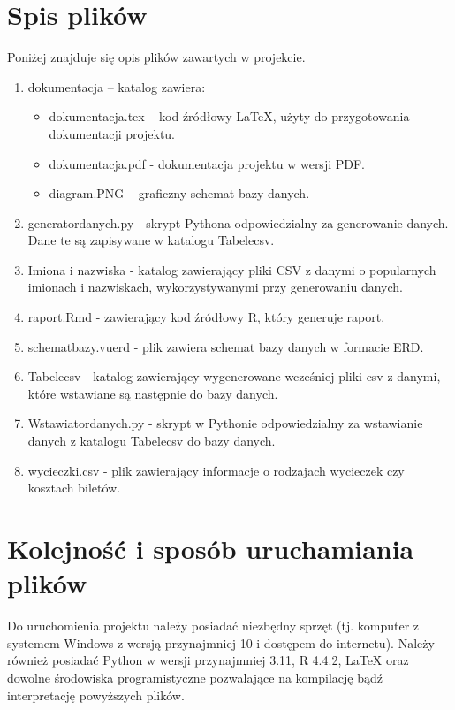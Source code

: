 \documentclass{article}
\begin{document}
	\section{Spis plików}
	
	Poniżej znajduje się opis plików zawartych w projekcie.
	\begin{enumerate}
		\item dokumentacja – katalog zawiera:
		\begin{itemize}
			\item dokumentacja.tex – kod źródłowy LaTeX, użyty do przygotowania dokumentacji projektu.
			\item dokumentacja.pdf - dokumentacja projektu w wersji PDF.
			\item diagram.PNG – graficzny schemat bazy danych.
		\end{itemize}
		\item generator\textunderscore danych.py - skrypt Pythona odpowiedzialny za generowanie danych. Dane te są zapisywane w katalogu Tabele\textunderscore csv.
		\item Imiona i nazwiska - katalog zawierający pliki CSV z danymi o popularnych imionach i nazwiskach, wykorzystywanymi przy generowaniu danych.
		\item raport.Rmd - zawierający kod źródłowy R, który generuje raport.
		\item schemat\textunderscore bazy.vuerd - plik zawiera schemat bazy danych w formacie ERD.
		\item Tabele\textunderscore csv - katalog zawierający wygenerowane wcześniej pliki csv z danymi, które wstawiane są następnie do bazy danych.
		\item Wstawiator\textunderscore danych.py - skrypt w Pythonie odpowiedzialny za wstawianie danych z katalogu Tabele\textunderscore csv do bazy danych.
		\item wycieczki.csv - plik zawierający informacje o rodzajach wycieczek czy kosztach biletów.
	\end{enumerate}
	
	\section{Kolejność i sposób uruchamiania plików}
	
	Do uruchomienia projektu należy posiadać niezbędny sprzęt (tj. komputer z systemem Windows z wersją przynajmniej 10 i dostępem do internetu). Należy również posiadać Python w wersji przynajmniej 3.11, R 4.4.2, LaTeX oraz dowolne środowiska programistyczne pozwalające na kompilację bądź interpretację powyższych plików.
	
\end{document}
